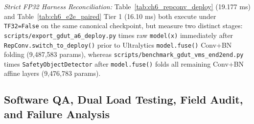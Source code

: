 \noindent\textit{Strict FP32 Harness Reconciliation:} Table~\ref{tab:ch6_repconv_deploy} (19.177 ms) and Table~\ref{tab:ch6_e2e_paired} Tier 1 (16.10 ms) both execute under \texttt{TF32=False} on the same canonical checkpoint, but measure two distinct stages: \nolinkurl{scripts/export_gdut_a6_deploy.py} times raw \texttt{model(x)} immediately after \nolinkurl{RepConv.switch_to_deploy()} prior to Ultralytics \nolinkurl{model.fuse()} Conv+BN folding (9,487,583 params), whereas \nolinkurl{scripts/benchmark_gdut_vms_end2end.py} times \texttt{SafetyObjectDetector} after \nolinkurl{model.fuse()} folds all remaining Conv+BN affine layers (9,476,783 params).

\begin{table}[htbp]
\centering
\caption{End-to-End 1080p Batched Multi-Stream Profiling of Canonical Rep-YOLO11s-GDUT-A6 (\texttt{21866da3 $\to$ d422dd1d}) on RTX 3050 ($N=1,2,4,8$).}
\label{tab:ch6_multistream}
\end{table}

\subsection{Software QA, Dual Load Testing, Field Audit, and Failure Analysis}


